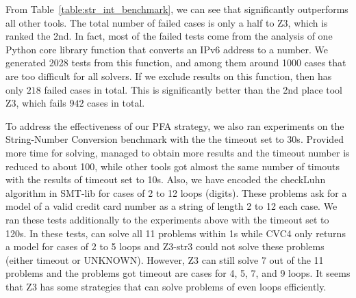 From Table~\ref{table:str_int_benchmark}, we can see that {\tool} significantly outperforms all other tools. The total number of failed cases is only a half to Z3, which is ranked the 2nd. In fact, most of the failed tests come from the analysis of one Python core library function that converts an IPv6 address to a number. We generated 2028 tests from this function, and among them around 1000 cases that are too difficult for all solvers.  If we exclude results on this function, then {\tool} has only $218$ failed cases in total. This is significantly better than the 2nd place tool Z3, which fails $942$ cases in total.

To address the effectiveness of our PFA strategy, we also ran experiments on the String-Number Conversion benchmark with the the timeout set to 30s. Provided more time for solving, {\tool} managed to obtain more results and the timeout number is reduced to about 100, while other tools got almost the same number of timouts with the results of timeout set to 10s. Also, we have encoded the checkLuhn algorithm in SMT-lib for cases of 2 to 12 loops (digits). These problems ask for a model of a valid credit card number as a string of length 2 to 12 each case. We ran these tests additionally to the experiments above with the timeout set to 120s. In these tests, {\tool} can solve all 11 problems within 1s while CVC4 only returns a model for cases of 2 to 5 loops and Z3-str3 could not solve these problems (either timeout or UNKNOWN). However, Z3 can still solve 7 out of the 11 problems and the problems got timeout are cases for 4, 5, 7, and 9 loops. It seems that Z3 has some strategies that can solve problems of even loops efficiently. 

